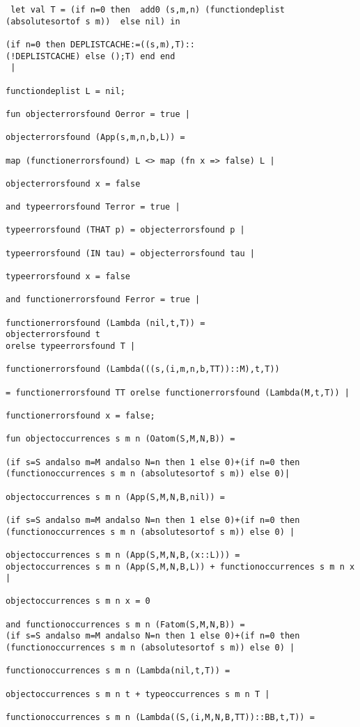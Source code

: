 \documentclass[12pt]{article}
\begin{document}
\begin{verbatim}
 let val T = (if n=0 then  add0 (s,m,n) (functiondeplist 
(absolutesortof s m))  else nil) in

(if n=0 then DEPLISTCACHE:=((s,m),T)::
(!DEPLISTCACHE) else ();T) end end
 |

functiondeplist L = nil;

fun objecterrorsfound Oerror = true |

objecterrorsfound (App(s,m,n,b,L)) =

map (functionerrorsfound) L <> map (fn x => false) L |

objecterrorsfound x = false 

and typeerrorsfound Terror = true |

typeerrorsfound (THAT p) = objecterrorsfound p |

typeerrorsfound (IN tau) = objecterrorsfound tau |

typeerrorsfound x = false 

and functionerrorsfound Ferror = true |

functionerrorsfound (Lambda (nil,t,T)) = 
objecterrorsfound t 
orelse typeerrorsfound T |

functionerrorsfound (Lambda(((s,(i,m,n,b,TT))::M),t,T))

= functionerrorsfound TT orelse functionerrorsfound (Lambda(M,t,T)) |

functionerrorsfound x = false;

fun objectoccurrences s m n (Oatom(S,M,N,B)) =

(if s=S andalso m=M andalso N=n then 1 else 0)+(if n=0 then
(functionoccurrences s m n (absolutesortof s m)) else 0)|

objectoccurrences s m n (App(S,M,N,B,nil)) =

(if s=S andalso m=M andalso N=n then 1 else 0)+(if n=0 then
(functionoccurrences s m n (absolutesortof s m)) else 0) |

objectoccurrences s m n (App(S,M,N,B,(x::L))) =
objectoccurrences s m n (App(S,M,N,B,L)) + functionoccurrences s m n x |

objectoccurrences s m n x = 0

and functionoccurrences s m n (Fatom(S,M,N,B)) =
(if s=S andalso m=M andalso N=n then 1 else 0)+(if n=0 then
(functionoccurrences s m n (absolutesortof s m)) else 0) |

functionoccurrences s m n (Lambda(nil,t,T)) =

objectoccurrences s m n t + typeoccurrences s m n T |

functionoccurrences s m n (Lambda((S,(i,M,N,B,TT))::BB,t,T)) =


\end{verbatim}
\end{document}
